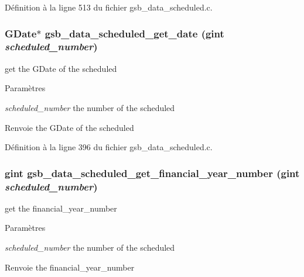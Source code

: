 Définition à la ligne 513 du fichier gsb\_\-data\_\-scheduled.c.

\subsubsection[{gsb\_\-data\_\-scheduled\_\-get\_\-date}]{\setlength{\rightskip}{0pt plus 5cm}GDate$\ast$ gsb\_\-data\_\-scheduled\_\-get\_\-date (gint {\em scheduled\_\-number})}\label{gsb__data__scheduled_8h_ae4e987a3bddc7f5550d91fae634d6dee}
get the GDate of the scheduled


\begin{DoxyParams}{Paramètres}
\item[{\em scheduled\_\-number}]the number of the scheduled\end{DoxyParams}
\begin{DoxyReturn}{Renvoie}
the GDate of the scheduled 
\end{DoxyReturn}


Définition à la ligne 396 du fichier gsb\_\-data\_\-scheduled.c.

\subsubsection[{gsb\_\-data\_\-scheduled\_\-get\_\-financial\_\-year\_\-number}]{\setlength{\rightskip}{0pt plus 5cm}gint gsb\_\-data\_\-scheduled\_\-get\_\-financial\_\-year\_\-number (gint {\em scheduled\_\-number})}\label{gsb__data__scheduled_8h_a11bf3eb936d3cafc51cfe1fbd3d6a770}
get the financial\_\-year\_\-number


\begin{DoxyParams}{Paramètres}
\item[{\em scheduled\_\-number}]the number of the scheduled\end{DoxyParams}
\begin{DoxyReturn}{Renvoie}
the financial\_\-year\_\-number 
\end{DoxyReturn}



